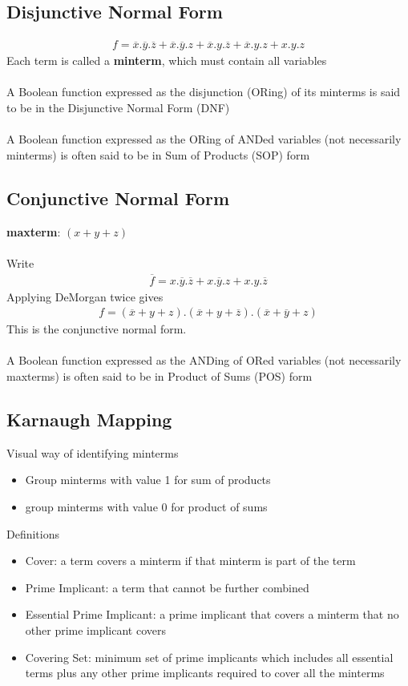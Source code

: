 \documentclass[12pt,a4paper]{article} %
\begin{document}
\subsection{Disjunctive Normal Form}
\begin{align}
f=\overline{x}.\overline{y}.\overline{z}+\overline{x}.\overline{y}.z+\overline{x}.y.\overline{z}+\overline{x}.y.z+x.y.z
\end{align}
Each term is called a \textbf{minterm}, which must contain all variables
\\\\
A Boolean function expressed as the
disjunction (ORing) of its minterms is said
to be in the Disjunctive Normal Form (DNF)
\\\\
A Boolean function expressed as the
ORing of ANDed variables (not necessarily
minterms) is often said to be in Sum of
Products (SOP) form
\subsection{Conjunctive Normal Form}
\textbf{maxterm}: $(x+y+z)$
\\\\
Write 
\begin{align*}
\overline{f} = x.\overline{y}.\overline{z}+x.\overline{y}.z+x.y.\overline{z}
\end{align*}
Applying DeMorgan twice gives
\begin{align*}
f=(\overline{x}+y+z).(\overline{x}+y+\overline{z}).(\overline{x}+\overline{y}+z)
\end{align*}
This is the conjunctive normal form.
\\\\
A Boolean function expressed as the ANDing
of ORed variables (not necessarily maxterms)
is often said to be in Product of Sums (POS)
form
\subsection{Karnaugh Mapping}
Visual way of identifying minterms
\begin{itemize}
\item Group minterms with value 1 for sum of products
\item group minterms with value 0 for product of sums
\end{itemize}
Definitions
\begin{itemize}
\item Cover: a term covers a minterm if that minterm is part of the term
\item Prime Implicant: a term that cannot be further combined
\item Essential Prime Implicant: a prime implicant that covers a minterm that no other prime implicant covers
\item Covering Set: minimum set of prime implicants which includes all essential terms plus any other prime implicants required to cover all the minterms
\end{itemize}
\end{document}
